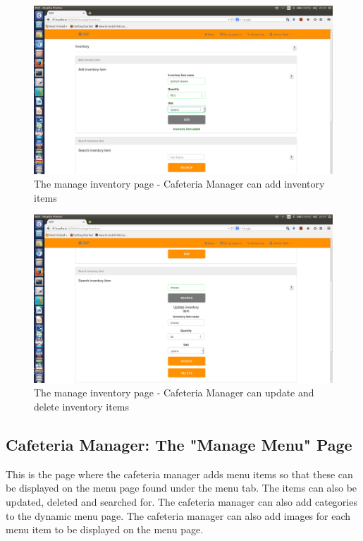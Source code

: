 \documentclass[a4paper,12pt]{report}
\begin{document}
\begin{figure}[H]
  \centering
    \includegraphics[width=1.0\textwidth]{screenshots/addInv.png}
    \caption{The manage inventory page - Cafeteria Manager can add inventory items}
\end{figure}

\begin{figure}[H]
  \centering
    \includegraphics[width=1.0\textwidth]{screenshots/updateInv.png}
    \caption{The manage inventory page - Cafeteria Manager can update and delete inventory items}
\end{figure}
\subsection{Cafeteria Manager: The "Manage Menu" Page}
This is the page where the cafeteria manager adds menu items so that these can be displayed on the menu page found under the menu tab. The items can also be updated, deleted and searched for. The cafeteria manager can also add categories to the dynamic menu page. The cafeteria manager can also add images for each menu item to be displayed on the menu page.
\end{document}
